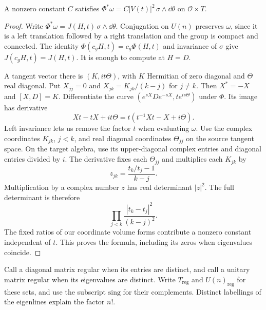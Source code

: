 \begin{lemma}\label{lem:jacobian}
A nonzero constant $C$ satisfies
$\Phi^*\omega=C|V(t)|^2\,\sigma\wedge\dd\theta$ on $\mathcal O\times T$.
\end{lemma}
\begin{proof}
Write $\Phi^*\omega=J(H,t)\,\sigma\wedge\dd\theta$.
Conjugation on $U(n)$ preserves $\omega$, since it is a left translation
followed by a right translation and the group is compact and connected.
The identity $\Phi(c_gH,t)=c_g\Phi(H,t)$ and invariance of $\sigma$
give $J(c_gH,t)=J(H,t)$. It is enough to compute at $H=D$.

A tangent vector there is $(K,it\Theta)$, with $K$ Hermitian of zero
diagonal and $\Theta$ real diagonal. Put $X_{jj}=0$ and
$X_{jk}=K_{jk}/(k-j)$ for $j\ne k$.
Then $X^*=-X$ and $[X,D]=K$.
Differentiate the curve $(e^{sX}De^{-sX},te^{is\Theta})$ under $\Phi$.
Its image has derivative
\[
 Xt-tX+it\Theta=t(t^{-1}Xt-X+i\Theta).
\]
Left invariance lets us remove the factor $t$ when evaluating $\omega$.
Use the complex coordinates $K_{jk}$, $j<k$, and real diagonal coordinates
$\Theta_{jj}$ on the source tangent space.
On the target algebra, use its upper-diagonal complex entries and diagonal
entries divided by $i$. The derivative fixes each $\Theta_{jj}$ and
multiplies each $K_{jk}$ by
\[
 z_{jk}=\frac{t_k/t_j-1}{k-j}.
\]
Multiplication by a complex number $z$ has real determinant $|z|^2$.
The full determinant is therefore
\[
 \prod_{j<k}\frac{|t_k-t_j|^2}{(k-j)^2}.
\]
The fixed ratios of our coordinate volume forms contribute a nonzero
constant independent of $t$. This proves the formula, including its zeros
when eigenvalues coincide.
\end{proof}

Call a diagonal matrix regular when its entries are distinct, and call a
unitary matrix regular when its eigenvalues are distinct.
Write $T_{\mathrm{reg}}$ and $U(n)_{\mathrm{reg}}$ for these sets,
and use the subscript $\mathrm{sing}$ for their complements.
Distinct labellings of the eigenlines explain the factor $n!$.

